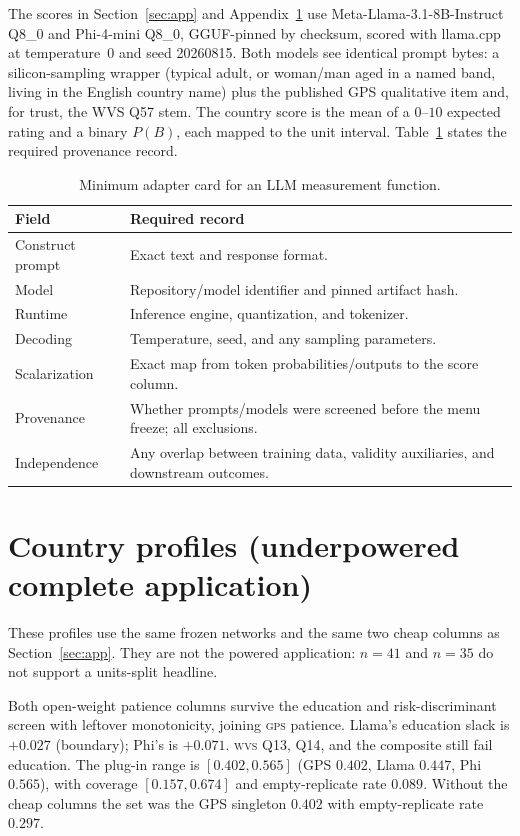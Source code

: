 \documentclass[10pt,letterpaper]{article}
\newcommand{\GPS}{\textsc{gps}}
\newcommand{\WVS}{\textsc{wvs}}
\begin{document}
The scores in Section~\ref{sec:app} and Appendix~\ref{app:country} use Meta-Llama-3.1-8B-Instruct Q8\_0 and Phi-4-mini Q8\_0, GGUF-pinned by checksum, scored with llama.cpp at temperature~0 and seed 20260815.
Both models see identical prompt bytes: a silicon-sampling wrapper (typical adult, or woman/man aged in a named band, living in the English country name) plus the published GPS qualitative item and, for trust, the WVS Q57 stem.
The country score is the mean of a $0$--$10$ expected rating and a binary $P(B)$, each mapped to the unit interval.
Table~\ref{tab:adapter} states the required provenance record.

\begin{table}[ht]
\centering
\small
\caption{Minimum adapter card for an LLM measurement function.}
\label{tab:adapter}
\begin{tabularx}{\textwidth}{@{}>{\raggedright\arraybackslash}p{3.0cm} X@{}}
\toprule
\textbf{Field} & \textbf{Required record} \\
\midrule
Construct prompt & Exact text and response format. \\
Model & Repository/model identifier and pinned artifact hash. \\
Runtime & Inference engine, quantization, and tokenizer. \\
Decoding & Temperature, seed, and any sampling parameters. \\
Scalarization & Exact map from token probabilities/outputs to the score column. \\
Provenance & Whether prompts/models were screened before the menu freeze; all exclusions. \\
Independence & Any overlap between training data, validity auxiliaries, and downstream outcomes. \\
\bottomrule
\end{tabularx}
\end{table}

\section{Country profiles (underpowered complete application)}
\label{app:country}

These profiles use the same frozen networks and the same two cheap columns as Section~\ref{sec:app}.
They are not the powered application: $n=41$ and $n=35$ do not support a units-split headline.

Both open-weight patience columns survive the education and risk-discriminant screen with leftover monotonicity, joining \GPS{} patience.
Llama's education slack is $+0.027$ (boundary); Phi's is $+0.071$.
\WVS{} Q13, Q14, and the composite still fail education.
The plug-in range is $[0.402,0.565]$ (GPS $0.402$, Llama $0.447$, Phi $0.565$), with coverage $[0.157,0.674]$ and empty-replicate rate $0.089$.
Without the cheap columns the set was the GPS singleton $0.402$ with empty-replicate rate $0.297$.
\end{document}
